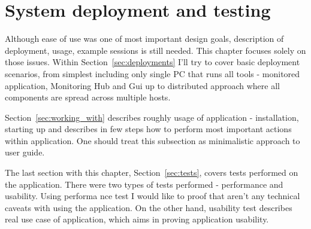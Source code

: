  
%


\chapter{System deployment and testing}
\label{cha:deployment}

Although ease of use was one of most important design goals, description of deployment, usage, example sessions is still needed. This chapter focuses solely on those issues. Within Section~\ref{sec:deployments} I\rq{}ll try to cover basic deployment scenarios, from simplest including only single PC that runs all tools - monitored application, Monitoring Hub and Gui up to distributed approach where all components are spread across multiple hosts. 

Section~\ref{sec:working_with} describes roughly usage of application - installation, starting up and describes in few steps how to perform most important actions within application. One should treat this subsection as minimalistic approach to user guide.

The last section with this chapter, Section~\ref{sec:tests}, covers tests performed on the application. There were two types of tests performed - performance and usability. Using performa nce test I would like to proof that aren\rq{}t any technical caveats with using the application. On the other hand, usability test describes real use case  of application, which aims in proving application usability. 









